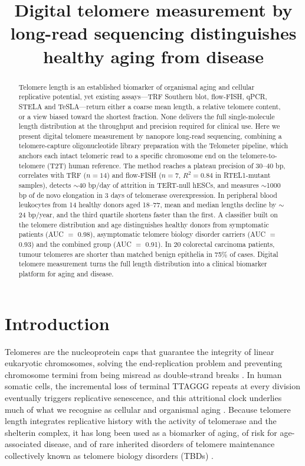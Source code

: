 \documentclass[11pt]{article}
\title{Digital telomere measurement by long-read sequencing distinguishes healthy aging from disease}
\author{}
\date{}
\begin{document}
\maketitle

\begin{abstract}
Telomere length is an established biomarker of organismal aging and cellular
replicative potential, yet existing assays---TRF Southern blot, flow-FISH,
qPCR, STELA and TeSLA---return either a coarse mean length, a relative
telomere content, or a view biased toward the shortest fraction. None
delivers the full single-molecule length distribution at the throughput
and precision required for clinical use. Here we present digital telomere
measurement by nanopore long-read sequencing, combining a telomere-capture
oligonucleotide library preparation with the Telometer pipeline, which
anchors each intact telomeric read to a specific chromosome end on the
telomere-to-telomere (T2T) human reference. The method reaches a plateau
precision of 30--40 bp, correlates with TRF ($n{=}14$) and flow-FISH
($n{=}7$, $R^{2}{=}0.84$ in RTEL1-mutant samples), detects $\sim$40 bp/day
of attrition in TERT-null hESCs, and measures $\sim$1000 bp of de novo
elongation in 3 days of telomerase overexpression. In peripheral blood
leukocytes from 14 healthy donors aged 18--77, mean and median lengths
decline by $\sim$24 bp/year, and the third quartile shortens faster than
the first. A classifier built on the telomere distribution and age
distinguishes healthy donors from symptomatic patients (AUC $=$ 0.98),
asymptomatic telomere biology disorder carriers (AUC $=$ 0.93) and the
combined group (AUC $=$ 0.91). In 20 colorectal carcinoma patients, tumour
telomeres are shorter than matched benign epithelia in 75\% of cases.
Digital telomere measurement turns the full length distribution into a
clinical biomarker platform for aging and disease.
\end{abstract}

\section{Introduction}

Telomeres are the nucleoprotein caps that guarantee the integrity of
linear eukaryotic chromosomes, solving the end-replication problem and
preventing chromosome termini from being misread as double-strand breaks
\citep{delange2005shelterin,palm2008howshelterin}. In human somatic cells,
the incremental loss of terminal TTAGGG repeats at every division
eventually triggers replicative senescence, and this attritional clock
underlies much of what we recognise as cellular and organismal aging
\citep{harley1990telomeres,blackburn2006human}. Because telomere length
integrates replicative history with the activity of telomerase and the
shelterin complex, it has long been used as a biomarker of aging, of
risk for age-associated disease, and of rare inherited disorders of
telomere maintenance collectively known as telomere biology disorders
(TBDs) \citep{armanios2012telomeres,bertuch2016molecular,aubert2012telomere}.
\end{document}
